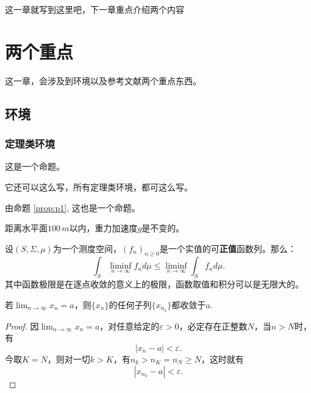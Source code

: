 这一章就写到这里吧，下一章重点介绍两个内容

\chapter{两个重点}
这一章，会涉及到环境以及参考文献两个重点东西。

\section{环境}
\subsection{定理类环境}

\begin{proposition}\label{prop:p1}
这是一个命题。
\end{proposition}

它还可以这么写，所有定理类环境，都可这么写。

\begin{proposition}[命题名]
由命题 \ref{prop:p1}, 这也是一个命题。
\end{proposition}

\begin{assumption}
距离水平面$100\,m$以内，重力加速度$g$是不变的。
\end{assumption}

\begin{lemma}[法图引理]
设$(S,\Sigma,\mu)$为一个测度空间，$(f_n)_{n\geq 0}$是一个实值的可\textbf{正值}函数列。那么：
\[
\int_S \liminf_{n\rightarrow \infty} f_n d\mu \leqslant \liminf_{n\rightarrow \infty} \int_S f_n d\mu.
\]
其中函数极限是在逐点收敛的意义上的极限，函数取值和积分可以是无限大的。
\end{lemma}

\begin{theorem}
若$\lim_{n\rightarrow \infty} x_n = a$，则$\{x_n\}$的任何子列$\{x_{n_k}\}$都收敛于$a$.
\end{theorem}
\begin{proof}
因$\lim_{n\rightarrow \infty} x_n = a$，对任意给定的$\varepsilon > 0$，必定存在正整数$N$，当$n>N$时，有
\[
|x_n-a|<\varepsilon.
\]
今取$K=N$，则对一切$k>K$，有$n_k>n_K=n_N\geq N$，这时就有
\[
|x_{n_k} - a|<\varepsilon.
\]
\end{proof}

